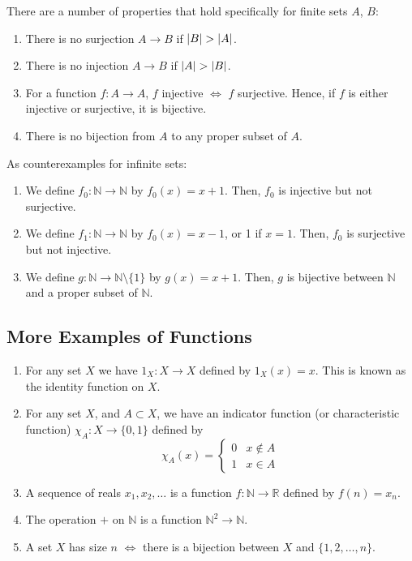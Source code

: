 \documentclass{article}
\begin{document}
	There are a number of properties that hold specifically for finite sets $A$, $B$:
	\begin{enumerate}
		\item There is no surjection $A \to B$ if $\abs{B} > \abs{A}$.
		\item There is no injection $A \to B$ if $\abs{A} > \abs{B}$.
		\item For a function $f\colon A \to A$, $f$ injective $\iff$ $f$ surjective. Hence, if $f$ is either injective or surjective, it is bijective.
		\item There is no bijection from $A$ to any proper subset of $A$.
	\end{enumerate}
	As counterexamples for infinite sets:
	\begin{enumerate}
		\item We define $f_0\colon \mathbb N \to \mathbb N$ by $f_0(x) = x+1$. Then, $f_0$ is injective but not surjective.
		\item We define $f_1\colon \mathbb N \to \mathbb N$ by $f_0(x) = x-1$, or 1 if $x=1$. Then, $f_0$ is surjective but not injective.
		\item We define $g\colon \mathbb N \to \mathbb N \setminus \{ 1 \}$ by $g(x) = x+1$. Then, $g$ is bijective between $\mathbb N$ and a proper subset of $\mathbb N$.
	\end{enumerate}

	\subsection{More Examples of Functions}
	\begin{enumerate}
		\item For any set $X$ we have $1_X\colon X \to X$ defined by $1_X(x) = x$. This is known as the identity function on $X$.
		\item For any set $X$, and $A \subset X$, we have an indicator function (or characteristic function) $\chi_A\colon X \to \{ 0, 1 \}$ defined by
		\[ \chi_A(x) = \begin{cases}
			0 & x \notin A \\
			1 & x \in A
		\end{cases} \]
		\item A sequence of reals $x_1, x_2, \dots$ is a function $f\colon \mathbb N \to \mathbb R$ defined by $f(n) = x_n$.
		\item The operation $+$ on $\mathbb N$ is a function $\mathbb N^2 \to \mathbb N$.
		\item A set $X$ has size $n$ $\iff$ there is a bijection between $X$ and $\{ 1, 2, \dots, n \}$.
	\end{enumerate}
\end{document}
